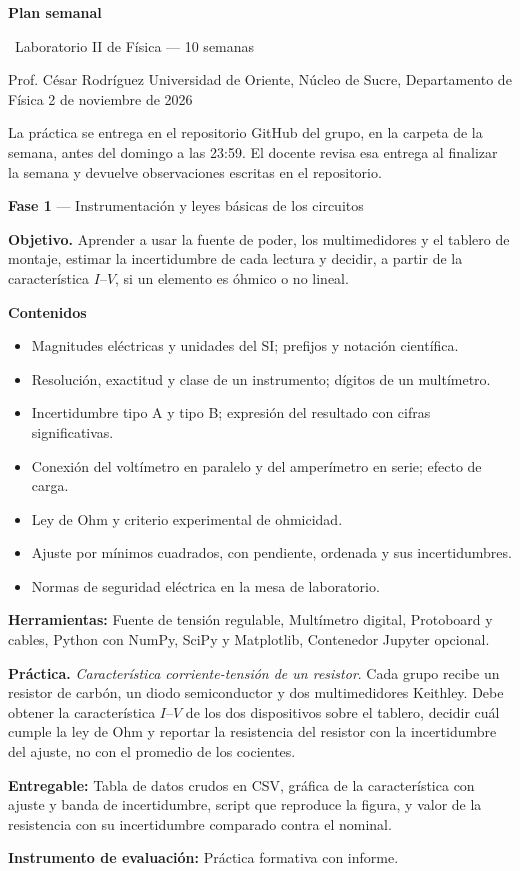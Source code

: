 \documentclass[11pt,a4paper]{article}
\newcommand{\iconoBanda}{microchip}
\newcommand{\bandaTitulo}[3][fondoOscuro]{%
  \begin{tcolorbox}[
    enhanced,
    colback=#1, colframe=#1,
    boxrule=0pt, arc=8pt, outer arc=8pt,
    width=\linewidth,
    top=18pt, bottom=6pt, left=14pt, right=14pt,
    borderline south={3.5pt}{0pt}{cyanNeon},
  ]
    \begin{minipage}[c]{0.07\linewidth}
      \centering
      \textcolor{cyanNeon}{\fontsize{30}{30}\selectfont\faIcon{\iconoBanda}}
    \end{minipage}%
    \hspace{8pt}%
    \begin{minipage}[c]{0.88\linewidth}
      {\fontsize{20}{24}\selectfont\bfseries\color{white}#2}\par\vspace{5pt}%
      \textcolor{cyanNeon!80!white}{\small\faIcon{angle-right}~#3}%
    \end{minipage}
    \vspace{4pt}
  \end{tcolorbox}%
  \vspace{8pt}%
}
\renewcommand{\iconoBanda}{atom}
\begin{document}
\bandaTitulo[fondoOscuro]{Plan semanal}{Laboratorio II de Física --- 10 semanas}

\begin{center}\small\color{grisTexto}Prof. César Rodríguez \textbar{} Universidad de Oriente, Núcleo de Sucre, Departamento de Física \textbar{} 2 de noviembre de 2026\end{center}

La práctica se entrega en el repositorio GitHub del grupo, en la carpeta de la semana, antes del domingo a las 23:59. El docente revisa esa entrega al finalizar la semana y devuelve observaciones escritas en el repositorio.

\begin{tcolorbox}[cajaContenido,title={Semana 1 --- Manejo del instrumental eléctrico y característica corriente-tensión}]
\textbf{Fase 1} --- Instrumentación y leyes básicas de los circuitos

\textbf{Objetivo.} Aprender a usar la fuente de poder, los multimedidores y el tablero de montaje, estimar la incertidumbre de cada lectura y decidir, a partir de la característica $I$--$V$, si un elemento es óhmico o no lineal.

\textbf{Contenidos}

\begin{itemize}[leftmargin=1.4em,itemsep=2pt,topsep=3pt]
  \item Magnitudes eléctricas y unidades del SI; prefijos y notación científica.
  \item Resolución, exactitud y clase de un instrumento; dígitos de un multímetro.
  \item Incertidumbre tipo A y tipo B; expresión del resultado con cifras significativas.
  \item Conexión del voltímetro en paralelo y del amperímetro en serie; efecto de carga.
  \item Ley de Ohm y criterio experimental de ohmicidad.
  \item Ajuste por mínimos cuadrados, con pendiente, ordenada y sus incertidumbres.
  \item Normas de seguridad eléctrica en la mesa de laboratorio.
\end{itemize}

\textbf{Herramientas:} Fuente de tensión regulable, Multímetro digital, Protoboard y cables, Python con NumPy, SciPy y Matplotlib, Contenedor Jupyter opcional.

\textbf{Práctica.} \emph{Característica corriente-tensión de un resistor}. Cada grupo recibe un resistor de carbón, un diodo semiconductor y dos multimedidores Keithley. Debe obtener la característica $I$--$V$ de los dos dispositivos sobre el tablero, decidir cuál cumple la ley de Ohm y reportar la resistencia del resistor con la incertidumbre del ajuste, no con el promedio de los cocientes.

\textbf{Entregable:} Tabla de datos crudos en CSV, gráfica de la característica con ajuste y banda de incertidumbre, script que reproduce la figura, y valor de la resistencia con su incertidumbre comparado contra el nominal.

\textbf{Instrumento de evaluación:} Práctica formativa con informe.
\end{tcolorbox}
\end{document}
